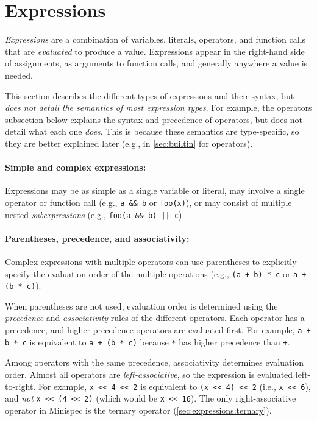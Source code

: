 \section{Expressions}
\label{sec:expressions}

\emph{Expressions} are a combination of variables, literals, operators, and function calls that are \emph{evaluated} to produce a value.
Expressions appear in the right-hand side of assignments, as arguments to function calls, and generally anywhere a value is needed.

This section describes the different types of expressions and their syntax, but \emph{does not detail the semantics of most expression types}.
For example, the operators subsection below explains the syntax and precedence of operators, but does not detail what each one \emph{does}.
This is because these semantics are type-specific, so they are better explained later (e.g., in \autoref{sec:builtin} for operators).

\paragraph{Simple and complex expressions:}
Expressions may be as simple as a single variable or literal, may involve a single operator or function call (e.g., \texttt{a \&\& b} or \texttt{foo(x)}),
or may consist of multiple nested \emph{subexpressions} (e.g., \texttt{foo(a \&\& b) || c}).

\paragraph{Parentheses, precedence, and associativity:}
Complex expressions with multiple operators can use parentheses to explicitly specify the evaluation order of the multiple operations
(e.g., \texttt{(a + b) * c} or \texttt{a + (b * c)}).

When parentheses are not used, evaluation order is determined using the \emph{precedence} and \emph{associativity} rules of the different operators.
Each operator has a precedence, and higher-precedence operators are evaluated first.
For example, \texttt{a + b * c} is equivalent to \texttt{a + (b * c)} because \texttt{*} has higher precedence than \texttt{+}.

Among operators with the same precedence, associativity determines evaluation order.
Almost all operators are \emph{left-associative}, so the expression is evaluated left-to-right.
For example, \verb|x << 4 << 2| is equivalent to \verb|(x << 4) << 2| (i.e., \verb|x << 6|),
and \emph{not} \verb|x << (4 << 2)| (which would be \verb|x << 16|).
The only right-associative operator in Minispec is the ternary operator (\autoref{sec:expressions:ternary}).

